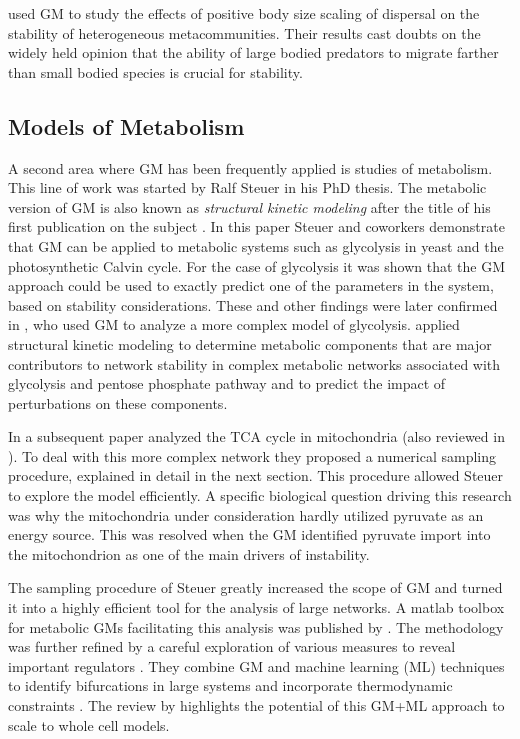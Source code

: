 \documentclass{article}
\begin{document}
\citet{anderson2021body} used GM to study the effects of positive body size scaling of dispersal on the stability of heterogeneous metacommunities. Their results cast doubts on the widely held opinion that the ability of large bodied predators to migrate farther than small bodied species is crucial for stability. 

\subsection{Models of Metabolism}
A second area where GM has been frequently applied is studies of metabolism. This line of work was started by Ralf Steuer in his PhD thesis. The metabolic version of GM is also known as \emph{structural kinetic modeling} after the title of his first publication on the subject \citep{Steuer2006PNAS}. In this paper Steuer and coworkers demonstrate that GM can be applied to metabolic systems such as glycolysis in yeast and the photosynthetic Calvin cycle. For the case of glycolysis it was shown that the GM approach could be used to exactly predict one of the parameters in the system, based on stability considerations. These and other findings were later confirmed in \citet{Gehrmann2011PRE}, who used GM to analyze a more complex model of glycolysis. 
\citet{carbonaro2017using} applied structural kinetic modeling to determine metabolic components that are major contributors to network stability in complex metabolic networks associated with glycolysis and pentose phosphate pathway and to predict the impact of perturbations on these components. 

In a subsequent paper \citet{Steuer2007BI} analyzed the TCA cycle in mitochondria (also reviewed in \citep{Steuer2007Phytochem}). To deal with this more complex network they proposed a numerical sampling procedure, explained in detail in the next section. This procedure allowed Steuer to explore the model efficiently. A specific biological question driving this research was why the mitochondria under consideration hardly utilized pyruvate as an energy source. This was resolved when the GM identified pyruvate import into the mitochondrion as one of the main drivers of instability.  

The sampling procedure of Steuer greatly increased the scope of GM and turned it into a highly efficient tool for the analysis of large networks. A matlab toolbox for metabolic GMs facilitating this analysis was published by \citet{Girbig2012BI}. The methodology was further refined by a careful exploration of various measures to reveal important regulators \citep{Grimbs2007MSB}. They combine GM and machine learning (ML) techniques to identify bifurcations in large systems \citep{Girbig2012Plos} and incorporate thermodynamic constraints \citep{Childs2015BI}. The review by \cite{Srinivasan2015BioTech} highlights the potential of this GM+ML approach to scale to whole cell models.
\end{document}
